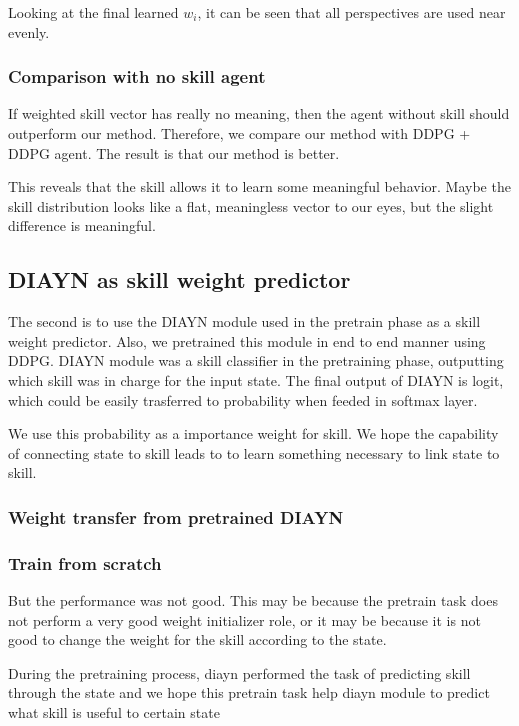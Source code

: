 Looking at the final learned $w_{i}$, it can be seen that all perspectives are used near evenly.

\subsubsection{Comparison with no skill agent}

If weighted skill vector has really no meaning, then the agent without skill should outperform our method.
Therefore, we compare our method with DDPG + DDPG agent. The result is that our method is better.

This reveals that the skill allows it to learn some meaningful behavior.
Maybe the skill distribution looks like a flat, meaningless vector to our eyes, but the slight difference is meaningful.

\subsection{DIAYN as skill weight predictor}
The second is to use the DIAYN module used in the pretrain phase as a skill weight predictor. Also, we pretrained this module in end to end manner using DDPG.
DIAYN module was a skill classifier in the pretraining phase, outputting which skill was in charge for the input state.
The final output of DIAYN is logit, which could be easily trasferred to probability when feeded in softmax layer.

We use this probability as a importance weight for skill.
We hope the capability of connecting state to skill leads to 
 to learn something necessary to link state to skill.
\subsubsection{Weight transfer from pretrained DIAYN}

\subsubsection{Train from scratch}

But the performance was not good. This may be because the pretrain task does not perform a very good weight initializer role, or it may be because it is not good to change the weight for the skill according to the state.

During the pretraining process, diayn performed the task of predicting skill through the state and we hope this pretrain task help diayn module to predict what skill is useful to certain state

